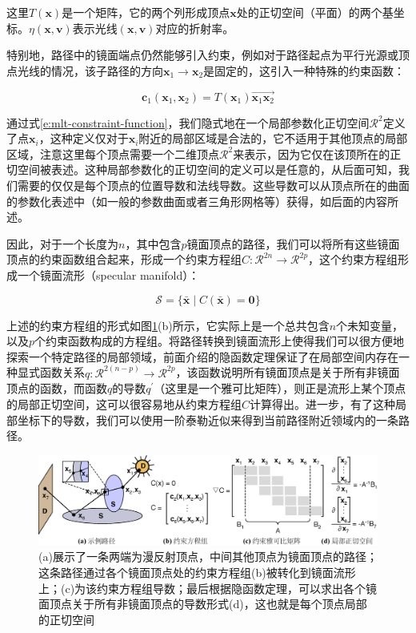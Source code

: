 \noindent 这里$T(\mathbf{x})$是一个矩阵，它的两个列形成顶点$\mathbf{x}$处的正切空间（平面）的两个基坐标。$\eta(\mathbf{x},\mathbf{v})$表示光线$(\mathbf{x},\mathbf{v})$对应的折射率。

特别地，路径中的镜面端点仍然能够引入约束，例如对于路径起点为平行光源或顶点光线的情况，该子路径的方向$\mathbf{x}_1\to\mathbf{x}_2$是固定的，这引入一种特殊的约束函数：

\begin{equation}
	\mathbf{c}_1(\mathbf{x}_1,\mathbf{x}_2)=T(\mathbf{x}_1)\overrightarrow{\mathbf{x}_1\mathbf{x}_2}
\end{equation}

\noindent 通过式\ref{e:mlt-constraint-function}，我们隐式地在一个局部参数化正切空间$\mathcal{R}^{2}$定义了点$\mathbf{x}_i$，这种定义仅对于$\mathbf{x}_i$附近的局部区域是合法的，它不适用于其他顶点的局部区域，注意这里每个顶点需要一个二维顶点$\mathcal{R}^{2}$来表示，因为它仅在该顶所在的正切空间被表述。这种局部参数化的正切空间的定义可以是任意的，从后面可知，我们需要的仅仅是每个顶点的位置导数和法线导数。这些导数可以从顶点所在的曲面的参数化表述中（如一般的参数曲面或者三角形网格等）获得，如后面的内容所述。

因此，对于一个长度为$n$，其中包含$p$镜面顶点的路径，我们可以将所有这些镜面顶点的约束函数组合起来，形成一个约束方程组$C:\mathcal{R}^{2n}\to\mathcal{R}^{2p}$，这个约束方程组形成一个镜面流形（specular manifold）：

\begin{equation}\label{e:mlt-manifold}
	\mathcal{S}=\{\bar{\mathbf{x}}\mid C(\bar{\mathbf{x}})=\mathbf{0}\}
\end{equation}

\noindent 上述的约束方程组的形式如图\ref{f:mlt-manifold-constraint}(b)所示，它实际上是一个总共包含$n$个未知变量，以及$p$个约束函数构成的方程组。将路径转换到镜面流形上使得我们可以很方便地探索一个特定路径的局部领域，前面介绍的隐函数定理保证了在局部空间内存在一种显式函数关系$q:\mathcal{R}^{2(n-p)}\to\mathcal{R}^{2p}$，该函数说明所有镜面顶点是关于所有非镜面顶点的函数，而函数$q$的导数$q^{'}$（这里是一个雅可比矩阵），则正是流形上某个顶点的局部正切空间，这可以很容易地从约束方程组$C$计算得出。进一步，有了这种局部坐标下的导数，我们可以使用一阶泰勒近似来得到当前路径附近领域内的一条路径。

\begin{figure}
\begin{fullwidth}
	\includegraphics[width=1.0\thewidth]{figures/mlt/manifold-constraint}
	\caption{(a)展示了一条两端为漫反射顶点，中间其他顶点为镜面顶点的路径；这条路径通过各个镜面顶点处的约束方程组(b)被转化到镜面流形上；(c)为该约束方程组导数；最后根据隐函数定理，可以求出各个镜面顶点关于所有非镜面顶点的导数形式(d)，这也就是每个顶点局部的正切空间}
	\label{f:mlt-manifold-constraint}
\end{fullwidth}
\end{figure}

